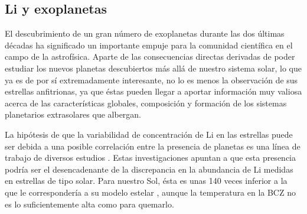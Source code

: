 \subsection{Li y exoplanetas}
El descubrimiento de un gran número de exoplanetas durante las dos últimas décadas \cite{Mayor1995, Bonfils2018} ha significado un importante empuje para la comunidad científica en el campo de la astrofísica. Aparte de las consecuencias directas derivadas de poder estudiar los nuevos planetas descubiertos más allá de nuestro sistema solar, lo que ya es de por sí extremadamente interesante, no lo es menos la observación de sus estrellas anfitrionas, ya que éstas pueden llegar a aportar información muy valiosa acerca de las características globales, composición y formación de los sistemas planetarios extrasolares que albergan.\par

La hipótesis de que la variabilidad de concentración de Li en las estrellas puede ser debida a una posible correlación entre la presencia de planetas es una línea de trabajo de diversos estudios \cite{Israelian2009, DelgadoMena2014, Figueira2014}. Estas investigaciones apuntan a que esta presencia podría ser el desencadenante de la discrepancia en la abundancia de Li medidas en estrellas de tipo solar. Para nuestro Sol, ésta es unas 140 veces inferior a la que le correspondería a su modelo estelar \cite{Israelian2009}, aunque la temperatura en la BCZ no es lo suficientemente alta como para quemarlo.\par

